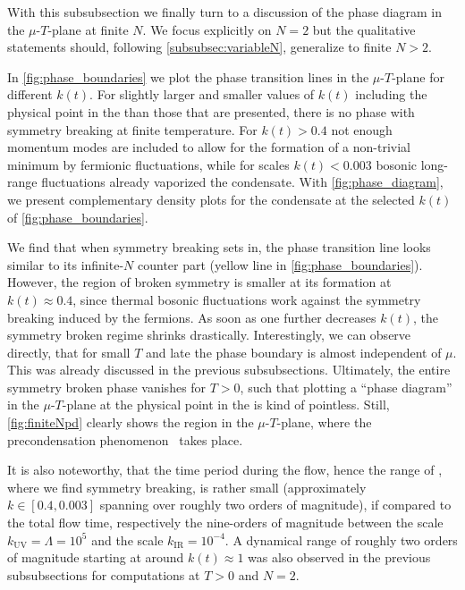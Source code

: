 	With this subsubsection we finally turn to a discussion of the phase diagram in the $\mu$-$T$-plane at finite $N$. We focus explicitly on $N = 2$ but the qualitative statements should, following \cref{subsubsec:variableN}, generalize to finite $N > 2$.
	
	In \cref{fig:phase_boundaries} we plot the phase transition lines in the $\mu$-$T$-plane for different $k ( t )$.
	For slightly larger and smaller values of $k ( t )$ \dash{} including the physical point in the \ir{} \dash{} than those that are presented, there is no phase with \ZII{} symmetry breaking at finite temperature. 
	For $k(t)>0.4$ not enough momentum modes are included to allow for the formation of a non-trivial minimum by fermionic fluctuations, while for scales $k(t)<0.003$ bosonic long-range fluctuations already vaporized the condensate. With \cref{fig:phase_diagram}, we present complementary density plots for the condensate at the selected $k(t)$ of \cref{fig:phase_boundaries}.

	We find that when symmetry breaking sets in, the phase transition line looks similar to its infinite-$N$ counter part (yellow line in  \cref{fig:phase_boundaries}). However, the region of broken \ZII{} symmetry is smaller at its formation at $k(t)\approx0.4$, since thermal bosonic fluctuations work against the symmetry breaking induced by the fermions. As soon as one further decreases $k ( t )$, the symmetry broken regime shrinks drastically. Interestingly, we can observe directly, that for small $T$ and late \rgtimes{} the phase boundary is almost independent of $\mu$. This was already discussed in the previous subsubsections. Ultimately, the entire \ZII{} symmetry broken phase vanishes for $T > 0$, such that plotting a ``phase diagram'' in the $\mu$-$T$-plane at the physical point in the \ir{} is kind of pointless. Still, \cref{fig:finiteNpd} clearly shows the region in the $\mu$-$T$-plane, where the precondensation phenomenon~\cite{Boettcher:2012cm,Boettcher:2012dh,Boettcher:2013kia,Boettcher:2014tfa,Roscher:2015xha,Khan:2015puu} takes place.

	It is also noteworthy, that the time period during the \frg{} flow, hence the range of \rgscales{}, where we find \ZII{} symmetry breaking, is rather small (approximately $k \in [ 0.4, 0.003 ]$ spanning over roughly two orders of magnitude), if compared to the total flow time, respectively the nine-orders of magnitude between the \uv{} scale $k_\mathrm{UV} = \Lambda = 10^5$ and the \ir{} scale $k_\mathrm{IR} = 10^{-4}$. A dynamical range of roughly two orders of magnitude starting at around $k(t)\approx 1$ was also observed in the previous subsubsections for computations at $T>0$ and $N=2$.\bigskip
	
